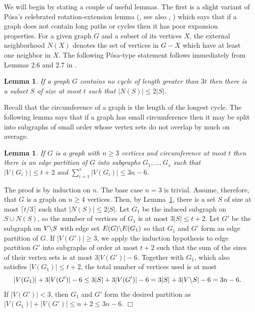 \documentclass[11pt]{article}
\newtheorem{lemma}[theorem]{Lemma}
\newenvironment{proof}
      {\medskip\noindent{\bf Proof:}\hspace{1mm}}
      {\hfill$\Box$\medskip}
\begin{document}
We will begin by stating a couple of useful lemmas. The first is a slight variant of P\'osa's celebrated rotation-extension lemma (\cite{Po76}, see also \cite{B01}, \cite{L07}) which says that if a graph does not contain long paths or cycles then it has poor expansion properties. For a given graph $G$ and a subset of its vertices $X$, the external neighborhood $N(X)$ denotes the set of vertices in $G-X$ which have at least one neighbor in $X$. The following P\'osa-type statement follows immediately from Lemmas 2.6 and 2.7 in \cite{BBDK}.

\begin{lemma}\label{Posa}
If a graph $G$ contains no cycle of length greater than $3t$ then there is a subset $S$ of size at most $t$ such that $|N(S)| \leq 2|S|$.
\end{lemma}


Recall that the circumference of a graph is the length of the longest cycle. The following lemma says that if a graph has small circumference then it may be split into subgraphs of small order whose vertex sets do not overlap by much on average.

\begin{lemma}\label{circumference}
If $G$ is a graph with $n \geq 3$ vertices and circumference at most $t$ then there is an edge partition of $G$ into subgraphs $G_1, \dots, G_s$ such that $|V(G_i)| \leq t + 2$ and $\sum_{i=1}^s |V(G_i)| \leq 3 n - 6$.
\end{lemma}

\begin{proof}
The proof is by induction on $n$. The base case $n = 3$ is trivial. Assume, therefore, that $G$ is a graph on $n \geq 4$ vertices. Then, by Lemma~\ref{Posa}, there is a set $S$ of size at most $\lceil t/3 \rceil$ such that $|N(S)| \leq 2|S|$. Let $G_1$ be the induced subgraph on $S \cup N(S)$, so the number of vertices of $G_1$ is at most $3|S| \leq t + 2$. Let $G'$ be the subgraph on $V\char92 S$ with edge set $E(G)\char92 E(G_1)$ so that $G_1$ and $G'$ form an edge partition of $G$. If $|V(G')| \geq 3$, we apply the induction hypothesis to edge partition $G'$ into subgraphs of order at most $t + 2$ such that the sum of the sizes of their vertex sets is at most $3 |V(G')| - 6$. Together with $G_1$, which also satisfies $|V(G_1)| \leq t + 2$, the total number of vertices used is at most
\[|V(G_1)| + 3|V(G')| - 6 \leq 3|S| + 3|V(G')| - 6 = 3|S| + 3|V\char92 S| - 6 = 3 n - 6.  \]
If $|V(G')| < 3$, then $G_1$ and $G'$ form the desired partition as $|V(G_1)| + |V(G')| \leq n + 2 \leq 3n - 6$.
\end{proof}
\end{document}
